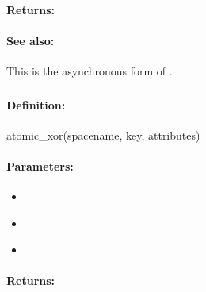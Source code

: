 \paragraph{Returns:}


\paragraph{See also:}  This is the asynchronous form of .

\pagebreak
\subsubsection{}
\label{api:ruby:atomic_xor}


\paragraph{Definition:}
\begin{rubycode}
atomic_xor(spacename, key, attributes)
\end{rubycode}

\paragraph{Parameters:}
\begin{itemize}[noitemsep]
\item {}\\

\item {}\\

\item {}\\

\end{itemize}

\paragraph{Returns:}


\pagebreak
\subsubsection{}
\label{api:ruby:async_atomic_xor}


